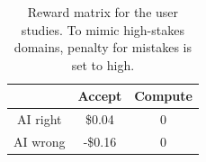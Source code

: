 \documentclass[letterpaper]{article} %
\newcommand{\bug}
    {\mbox{\rule{2mm}{2mm}}}
\newcommand{\Bug}[1]
    {\bug \footnote{BUG: {#1}}}
\newcommand{\eg}{\mbox{\it e.g.}}
\newcommand{\?}{\mbox{?}}
\begin{document}


\begin{table}[t]
    \centering
    \begin{tabular}{|c|c|c|}
    \hline
         & Accept & Compute  \\
         \hline
         AI right & \$0.04 & 0 \\
         \hline
         AI wrong & -\$0.16 & 0\\
         \hline
    \end{tabular}
    \caption{Reward matrix for the user studies. To mimic high-stakes domains, penalty for mistakes is set to high. 
    }
    \label{tab:payoff}
\end{table}
\end{document}

